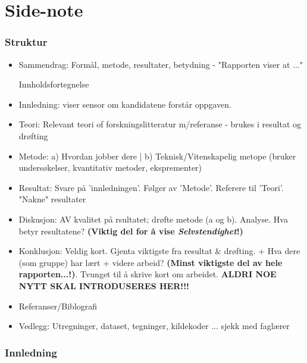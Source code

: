 \chapter{Side-note}

\subsection*{Struktur}

\begin{itemize}
    \item Sammendrag: Formål, metode, resultater, betydning - "Rapporten viser at ..."

    \itemm Innholdsfortegnelse

    \item Innledning: viser sensor om kandidatene forstår oppgaven.
    
    \item Teori: Relevant teori of forskningslitteratur m/referanse - brukes i resultat og drøfting

    \item Metode: a) Hvordan jobber dere | b) Teknisk/Vitenskapelig metope (bruker undersøkelser, kvantitativ metoder, eksprementer)

    \item Resultat: Svare på 'innledningen'. Følger av 'Metode'. Referere til 'Teori'. "Nakne" resultater

    \item Diskusjon: AV kvalitet på rsultatet; drøfte metode (a og b). Analyse. Hva betyr resultatene? \textbf{(Viktig del for å vise \textit{Selvstendighet}!)}

    \item Konklusjon: Veldig kort. Gjenta viktigste fra resultat \& drøfting. + Hva dere (som gruppe) har lært + videre arbeid? \textbf{(Minst viktigste del av hele rapporten...!)}. Tvunget til å skrive kort om arbeidet. \textbf{ALDRI NOE NYTT SKAL INTRODUSERES HER!!!}

    \item Referanser/Biblografi

    \item Vedlegg: Utregninger, dataset, tegninger, kildekoder ... sjekk med faglærer
\end{itemize}

\subsection*{Innledning}

